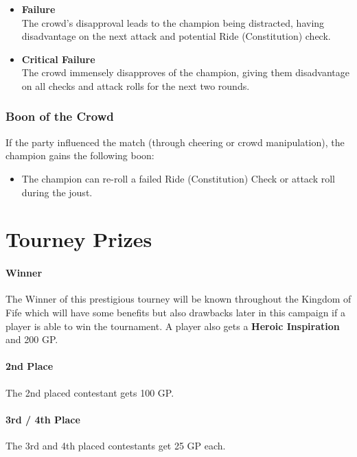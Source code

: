 {\begin{itemize}
\begin{itemize}
		The crowd's overwhelming support inspires the champion, giving them advantage on all checks and attack rolls for the next two rounds.
		\item \textbf{Failure}\\
		The crowd's disapproval leads to the champion being distracted, having disadvantage on the next attack and potential Ride (Constitution) check.
		\item \textbf{Critical Failure}\\
		The crowd immensely disapproves of the champion, giving them disadvantage on all checks and attack rolls for the next two rounds.
	\end{itemize}
\end{itemize}
}
\subsubsection*{Boon of the Crowd}
{\entryfont If the party influenced the match (through cheering or crowd manipulation), the champion gains the following boon:
\begin{itemize}
	\item The champion can re-roll a failed Ride (Constitution) Check or attack roll during the joust.
\end{itemize}
}

\section*{Tourney Prizes}
{\entryfont \paragraph*{Winner} The Winner of this prestigious tourney will be known throughout the Kingdom of Fife which will have some benefits but also drawbacks later in this campaign if a player is able to win the tournament. A player also gets a \textbf{Heroic Inspiration} and 200 GP.}
{\entryfont \paragraph*{2nd Place} The 2nd placed contestant gets 100 GP.}
{\entryfont \paragraph*{3rd / 4th Place} The 3rd and 4th placed contestants get 25 GP each.}

%